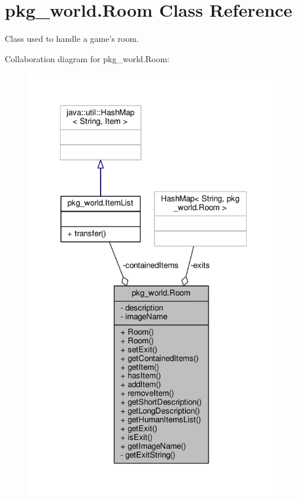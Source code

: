 \hypertarget{classpkg__world_1_1Room}{\section{pkg\-\_\-world.\-Room Class Reference}
\label{classpkg__world_1_1Room}
}


Class used to handle a game's room.  




Collaboration diagram for pkg\-\_\-world.\-Room\-:\nopagebreak
\begin{figure}[H]
\begin{center}
\leavevmode
\includegraphics[width=312pt]{classpkg__world_1_1Room__coll__graph}
\end{center}
\end{figure}
